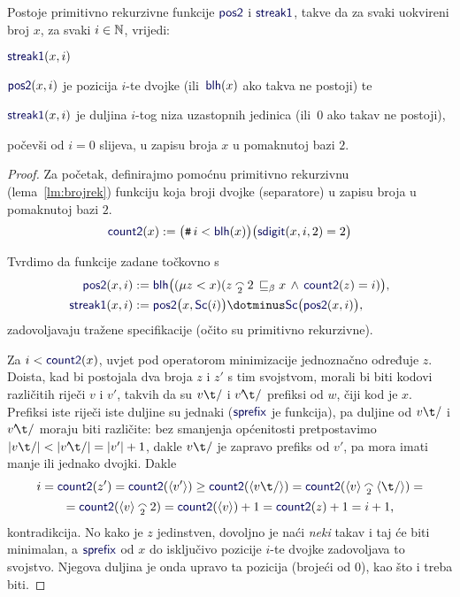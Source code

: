 \begin{lema}[{name=[primitivna rekurzivnost raščlambe binarnih zapisa]}]\label{lm:pos2streak1prn}
Postoje primitivno rekurzivne funkcije $\f{pos2}$ i $\f{streak1}$, takve da za svaki uokvireni broj $x$, za svaki $i\in{\mathbb N}$, vrijedi:
\begin{labeling}{$\f{streak1}(x,i)$}
    \item[$\f{pos2}(x,i)$] je pozicija $i$-te dvojke (ili\, $\f{blh}(x)$ ako takva ne postoji) te
    \item[$\f{streak1}(x,i)$] je duljina $i$-tog niza uzastopnih jedinica (ili\, $0$ ako takav ne postoji),
\end{labeling}
počevši od $i=0$ slijeva, u zapisu broja $x$ u pomaknutoj bazi $2$.
\end{lema}
\begin{proof}
Za početak, definirajmo pomoćnu primitivno rekurzivnu (lema~\ref{lm:brojrek}) funkciju koja broji dvojke (separatore) u zapisu broja u pomaknutoj bazi $2$.
\begin{equation}
    \f{count2}(x):=\bigl(\num i<\f{blh}(x)\bigr)\bigl(\f{sdigit}(x,i,2)=2\bigr)
\end{equation}

Tvrdimo da funkcije zadane točkovno s
\begin{align}
    \f{pos2}(x,i)&:=\f{blh}\bigl((\mu z<x)(z\conc22\,\sqsubseteq_\beta x\,\land\,\f{count2}(z)=i)\bigr),\\
    \f{streak1}(x,i)&:=\f{pos2}\bigl(x,\f{Sc}(i)\bigr)\dotminus\f{Sc}\bigl(\f{pos2}(x,i)\bigr),
\end{align}
zadovoljavaju tražene specifikacije (očito su primitivno rekurzivne).

Za $i<\f{count2}(x)$, uvjet pod operatorom minimizacije jednoznačno određuje $z$. Doista, kad bi postojala dva broja $z$ i $z'$ s tim svojstvom, morali bi biti kodovi različitih riječi $v$ i $v'$, takvih da su $v\t/$ i $v'\!\t/$ prefiksi od $w$, čiji kod je $x$. Prefiksi iste riječi iste duljine su jednaki ($\f{sprefix}$ je funkcija), pa duljine od $v\t/$ i $v'\!\t/$ moraju biti različite: bez smanjenja općenitosti pretpostavimo $\dulj{v\t/}<\dulj{v'\!\t/}=\dulj{v'}+1$, dakle $v\t/$ je zapravo prefiks od $v'$, pa mora imati manje ili jednako dvojki. Dakle
\begin{multline}
    i=\f{count2}(z')=\f{count2}(\kr{v'})\ge\f{count2}(\kr{v\t/})=\f{count2}(\kr v\conc2\kr{\t/})=\\
    =\f{count2}(\kr v\conc22)=\f{count2}(\kr v)+1=\f{count2}(z)+1=i+1\text,
\end{multline}
    kontradikcija. No kako je $z$ jedinstven, dovoljno je naći \emph{neki} takav i taj će biti minimalan, a $\f{sprefix}$ od $x$ do isključivo pozicije $i$-te dvojke zadovoljava to svojstvo. Njegova duljina je onda upravo ta pozicija (brojeći od $0$), kao što i treba biti.


\end{proof}
